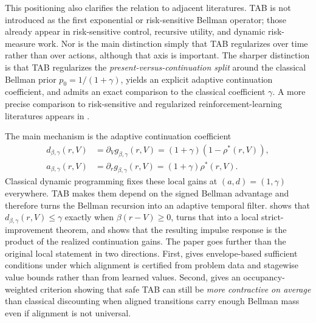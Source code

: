 \documentclass{article}
\theoremstyle{remark}
\begin{document}
This positioning also clarifies the relation to adjacent literatures. TAB is not introduced as the first exponential or risk-sensitive Bellman operator; those already appear in risk-sensitive control, recursive utility, and dynamic risk-measure work. Nor is the main distinction simply that TAB regularizes over time rather than over actions, although that axis is important. The sharper distinction is that TAB regularizes the \emph{present-versus-continuation split} around the classical Bellman prior $p_0=1/(1+\gamma)$, yields an explicit adaptive continuation coefficient, and admits an exact comparison to the classical coefficient $\gamma$. A more precise comparison to risk-sensitive and regularized reinforcement-learning literatures appears in .

The main mechanism is the adaptive continuation coefficient
\[
\begin{aligned}
d_{\beta,\gamma}(r,V)&=\partial_V g_{\beta,\gamma}(r,V)=(1+\gamma)(1-\rho^*(r,V)),\\
a_{\beta,\gamma}(r,V)&=\partial_r g_{\beta,\gamma}(r,V)=(1+\gamma)\rho^*(r,V).
\end{aligned}
\]
Classical dynamic programming fixes these local gains at $(a,d)=(1,\gamma)$ everywhere. TAB makes them depend on the signed Bellman advantage and therefore turns the Bellman recursion into an adaptive temporal filter.  shows that $d_{\beta,\gamma}(r,V)\le \gamma$ exactly when $\beta(r-V)\ge 0$,  turns that into a local strict-improvement theorem, and  shows that the resulting impulse response is the product of the realized continuation gains. The paper goes further than the original local statement in two directions. First,  gives envelope-based sufficient conditions under which alignment is certified from problem data and stagewise value bounds rather than from learned values. Second,  gives an occupancy-weighted criterion showing that safe TAB can still be \emph{more contractive on average} than classical discounting when aligned transitions carry enough Bellman mass even if alignment is not universal.
\end{document}
